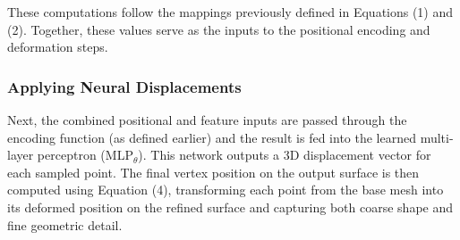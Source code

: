 These computations follow the mappings previously defined in Equations (1) and (2). 
Together, these values serve as the inputs to the positional encoding and deformation steps. 

\subsubsection{Applying Neural Displacements}

Next, the combined positional and feature inputs are passed through the encoding function (as defined earlier) and the result is fed into the learned multi-layer perceptron (MLP$_\theta$). 
This network outputs a 3D displacement vector for each sampled point. 
The final vertex position on the output surface is then computed using Equation (4), transforming each point from the base mesh into its deformed position on the refined surface and capturing both coarse shape and fine geometric detail. 





